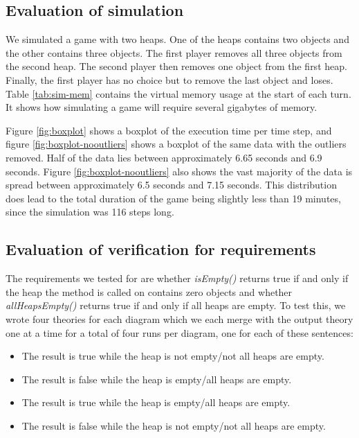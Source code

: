 \documentclass[conference]{IEEEtran}
\begin{document}
\subsection{Evaluation of simulation}

We simulated a game with two heaps. One of the heaps contains two objects and the other contains three objects. The first player removes all three objects from the second heap. The second player then removes one object from the first heap. Finally, the first player has no choice but to remove the last object and loses.
Table \ref{tab:sim-mem} contains the virtual memory usage at the start of each turn. It shows how simulating a game will require several gigabytes of memory.

Figure \ref{fig:boxplot} shows a boxplot of the execution time per time step, and figure \ref{fig:boxplot-nooutliers} shows a boxplot of the same data with the outliers removed. Half of the data lies between approximately 6.65 seconds and 6.9 seconds. Figure \ref{fig:boxplot-nooutliers} also shows the vast majority of the data is spread between approximately 6.5 seconds and 7.15 seconds. This distribution does lead to the total duration of the game being slightly less than 19 minutes, since the simulation was 116 steps long.

\subsection{Evaluation of verification for requirements}

The requirements we tested for are whether \textit{isEmpty()} returns true if and only if the heap the method is called on contains zero objects and whether \textit{allHeapsEmpty()} returns true if and only if all heaps are empty. To test this, we wrote four theories for each diagram which we each merge with the output theory one at a time for a total of four runs per diagram, one for each of these sentences:

\begin{itemize}
	\item The result is true while the heap is not empty/not all heaps are empty.
	\item The result is false while the heap is empty/all heaps are empty.
	\item The result is true while the heap is empty/all heaps are empty.
	\item The result is false while the heap is not empty/not all heaps are empty.
\end{itemize}
\end{document}
